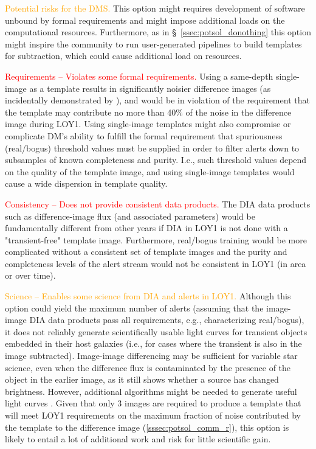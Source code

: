 \documentclass[DM,toc]{lsstdoc}
\begin{document}
\textcolor{orange}{ Potential risks for the DMS.}
This option might requires development of software unbound by formal requirements and might impose additional loads on the computational resources.
Furthermore, as in \S~\ref{ssec:potsol_donothing} this option might inspire the community to run user-generated pipelines to build templates for subtraction, which could cause additional load on resources.

\textcolor{red}{ Requirements -- Violates some formal requirements.}
Using a same-depth single-image as a template results in significantly noisier difference images (as incidentally demonstrated by ), and would be in violation of the requirement that the template may contribute no more than 40\% of the noise in the difference image during LOY1.
Using single-image templates might also compromise or complicate DM's ability to fulfill the formal requirement that spuriousness (real/bogus) threshold values must be supplied in order to filter alerts down to subsamples of known completeness and purity.
I.e., such threshold values depend on the quality of the template image, and using single-image templates would cause a wide dispersion in template quality.

\textcolor{red}{ Consistency -- Does not provide consistent data products.}
The DIA data products such as difference-image flux (and associated parameters) would be fundamentally different from other years if DIA in LOY1 is not done with a "transient-free" template image.
Furthermore, real/bogus training would be more complicated without a consistent set of template images and the purity and completeness levels of the alert stream would not be consistent in LOY1 (in area or over time).

\textcolor{orange}{ Science -- Enables some science from DIA and alerts in LOY1.}
Although this option could yield the maximum number of alerts (assuming that the image-image DIA data products pass all requirements, e.g., characterizing real/bogus), it does not reliably generate scientifically usable light curves for transient objects embedded in their host galaxies (i.e., for cases where the transient is also in the image subtracted).
Image-image differencing may be sufficient for variable star science, even when the difference flux is contaminated by the presence of the object in the earlier image, as it still shows whether a source has changed brightness.
However, additional algorithms might be needed to generate useful light curves \citep[e.g.,][]{2005AJ....130.2272B}.
Given that only 3 images are required to produce a template that will meet LOY1 requirements on the maximum fraction of noise contributed by the template to the difference image (\ref{sssec:potsol_comm_r}), this option is likely to entail  a lot of additional work and risk for little scientific gain.
\end{document}
